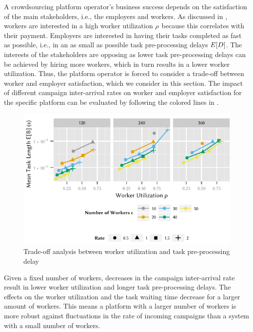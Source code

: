 A crowdsourcing platform operator's business success depends on the satisfaction of the main stakeholders, i.e., the employers and workers.
As discussed in , workers are interested in a high worker utilization \(\rho\) because this correlates with their payment.
Employers are interested in having their tasks completed as fast as possible, i.e., in an as small as possible task pre-processing delays \(E[D]\).
The interests of the stakeholders are opposing as lower task pre-processing delays can be achieved by hiring more workers, which in turn results in a lower worker utilization.
Thus, the platform operator is forced to consider a trade-off between worker and employer satisfaction, which we consider in this section.
The impact of different campaign inter-arrival rates on worker and employer satisfaction for the specific platform can be evaluated by following the colored lines in .

\begin{figure}
	\centering
	\includegraphics{cloud/crowdsourcing/numerical_evaluation/figures/pareto}
	\caption{Trade-off analysis between worker utilization and task pre-processing delay}
	\label{fig:cloud:crowdsourcing:performance_evaluation:tradeoff:pareto}
\end{figure}

Given a fixed number of workers, decreases in the campaign inter-arrival rate result in lower worker utilization and longer task pre-processing delays.
The effects on the worker utilization and the task waiting time decrease for a larger amount of workers.
This means a platform with a larger number of workers is more robust against fluctuations in the rate of incoming campaigns than a system with a small number of workers.

